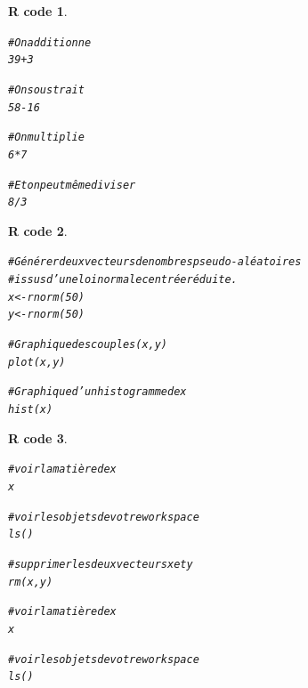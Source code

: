 \documentclass[11pt]{beamer}\usepackage[]{graphicx}\usepackage[]{color}
\makeatletter
\newcommand{\hlnum}[1]{\textcolor[rgb]{0.063,0.58,0.627}{#1}}%
\newcommand{\hlcom}[1]{\textcolor[rgb]{0.588,0.588,0.588}{#1}}%
\newcommand{\hlopt}[1]{\textcolor[rgb]{0.196,0.196,0.196}{#1}}%
\newcommand{\hlstd}[1]{\textcolor[rgb]{0.196,0.196,0.196}{#1}}%
\newcommand{\hlkwb}[1]{\textcolor[rgb]{0.627,0,0.314}{#1}}%
\newcommand{\hlkwd}[1]{\textcolor[rgb]{0.78,0.227,0.412}{#1}}%
\newenvironment{kframe}{%
 \def\at@end@of@kframe{}%
 \ifinner\ifhmode%
  \def\at@end@of@kframe{\end{minipage}}%
  \begin{minipage}{\columnwidth}%
 \fi\fi%
 \def\FrameCommand##1{\hskip\@totalleftmargin \hskip-\fboxsep
 \colorbox{shadecolor}{##1}\hskip-\fboxsep
     \hskip-\linewidth \hskip-\@totalleftmargin \hskip\columnwidth}%
 \MakeFramed {\advance\hsize-\width
   \@totalleftmargin\z@ \linewidth\hsize
   \@setminipage}}%
 {\par\unskip\endMakeFramed%
 \at@end@of@kframe}
\newenvironment{knitrout}{}{} %
\newtheorem{rcode}{R code}[section]
\makeatother
\begin{document}
\begin{frame}
\begin{knitrout}
\color{fgcolor}\begin{kframe}
\begin{rcode}\label{unnamed-chunk-3}\begin{alltt}
\hlcom{# On additionne}
\hlnum{39} \hlopt{+} \hlnum{3}

\hlcom{# On soustrait}
\hlnum{58} \hlopt{-} \hlnum{16}

\hlcom{# On multiplie}
\hlnum{6} \hlopt{*} \hlnum{7}

\hlcom{# Et on peut même diviser}
\hlnum{8} \hlopt{/} \hlnum{3}
\end{alltt}
\end{rcode}\end{kframe}
\end{knitrout}
\end{frame}



\begin{frame}
\begin{knitrout}
\color{fgcolor}\begin{kframe}
\begin{rcode}\label{unnamed-chunk-4}\begin{alltt}
\hlcom{# Générer deux vecteurs de nombres pseudo-aléatoires}
\hlcom{# issus d’une loi normale centrée réduite.}
\hlstd{x} \hlkwb{<-} \hlkwd{rnorm}\hlstd{(}\hlnum{50}\hlstd{)}
\hlstd{y} \hlkwb{<-} \hlkwd{rnorm}\hlstd{(}\hlnum{50}\hlstd{)}

\hlcom{# Graphique des couples (x, y)}
\hlkwd{plot}\hlstd{(x, y)}

\hlcom{# Graphique d'un histogramme de x}
\hlkwd{hist}\hlstd{(x)}
\end{alltt}
\end{rcode}\end{kframe}
\end{knitrout}
\end{frame}


\begin{frame}
\begin{knitrout}
\color{fgcolor}\begin{kframe}
\begin{rcode}\label{unnamed-chunk-5}\begin{alltt}
\hlcom{# voir la matière de x}
\hlstd{x}

\hlcom{# voir les objets de votre workspace}
\hlkwd{ls}\hlstd{()}

\hlcom{# supprimer les deux vecteurs x et y}
\hlkwd{rm}\hlstd{(x,y)}

\hlcom{# voir la matière de x}
\hlstd{x}

\hlcom{# voir les objets de votre workspace}
\hlkwd{ls}\hlstd{()}
\end{alltt}
\end{rcode}\end{kframe}
\end{knitrout}
\end{frame}
\end{document}

